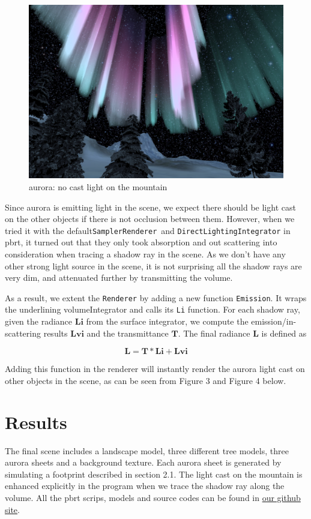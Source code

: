 \documentclass[10pt,a4paper]{article}
\begin{document}
\begin{figure}[h]
\centering
\includegraphics[width=0.7\linewidth]{./no_light_cast}
\caption{aurora: no cast light on the mountain}
\label{fig:no_light_cast}
\end{figure}

Since aurora is emitting light in the scene, we expect there should be light cast on the other objects if there is not occlusion between them. However, when we tried it with the default\texttt{SamplerRenderer}\ and \texttt{DirectLightingIntegrator} in pbrt, it turned out that they only took absorption and out scattering into consideration when tracing a shadow ray in the scene. As we don't have any other strong light source in the scene, it is not surprising all the shadow rays are very dim, and attenuated further by transmitting the volume.

As a result, we extent the \texttt{Renderer} by adding a new function \texttt{Emission}. It wraps the underlining volumeIntegrator and calls its \texttt{Li} function. For each shadow ray, given the radiance $\mathbf{Li}$ from the surface integrator, we compute the emission/in-scattering results $\mathbf{Lvi}$ and the transmittance $\mathbf{T}$. The final radiance $\mathbf{L}$ is defined as

\[
\mathbf{L = T * Li + Lvi}
\]

Adding this function in the renderer will instantly render the aurora light cast on other objects in the scene, as can be seen from Figure 3 and Figure 4 below.

\section{Results}

The final scene includes a landscape model, three different tree models, three aurora sheets and a background texture. Each aurora sheet is generated by simulating a footprint described in section 2.1. The light cast on the mountain is enhanced explicitly in the program when we trace the shadow ray along the volume. All the pbrt scrips, models and source codes can be found in \href{https://github.com/dut09/pbrt-v2}{our github site}. 
\end{document}
